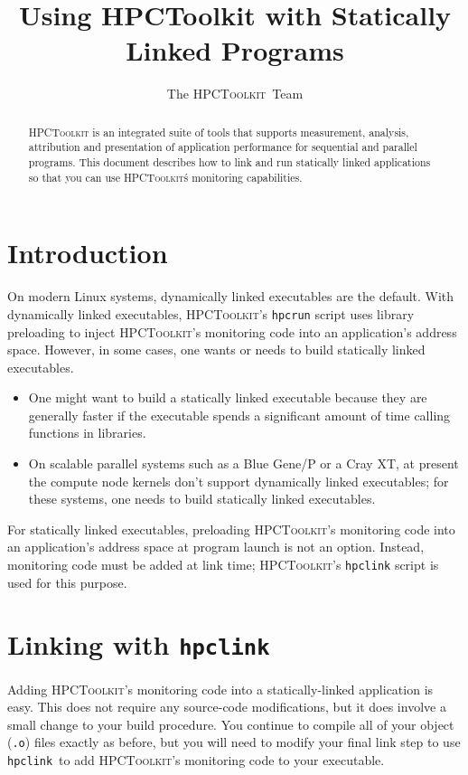 \documentclass[12pt]{article}
\newcommand{\HPCToolkit}{\textsc{HPCToolkit}}
\newcommand{\hpcrun}{\texttt{hpcrun}}
\newcommand{\hpclink}{\texttt{hpclink}}
\begin{document}
\title{Using {\sc HPCToolkit} with Statically Linked Programs}
\author{The \HPCToolkit\ Team}
\maketitle

\begin{abstract}
\HPCToolkit{} is an integrated suite of tools that supports
measurement, analysis, attribution and presentation of application
performance for sequential and parallel programs.  This document
describes how to link and run statically linked applications so that you can use
 \HPCToolkit\'s monitoring capabilities. 
 \end{abstract}

\section{Introduction}
On modern Linux systems, dynamically linked executables are the default. With dynamically linked executables, \HPCToolkit's \hpcrun{} script uses  library preloading
 to inject \HPCToolkit's monitoring code into an application's address space. 
However, in some cases, one wants or needs to build statically linked executables. 
\begin{itemize}
\item One might want to build a statically linked executable because they are generally faster if the executable spends a significant amount of time calling functions in libraries. 
\item On scalable parallel systems such as a Blue Gene/P or a Cray XT, at present the compute node kernels don't support dynamically linked executables; for these systems, one needs to build statically linked executables.
\end{itemize}

For statically linked executables, preloading \HPCToolkit's monitoring code into an application's address space at program launch is not an option. Instead, monitoring code must be added at link time; \HPCToolkit{}'s \hpclink{} script is used for this purpose.

\section{Linking with \hpclink }

Adding \HPCToolkit's monitoring
code into a statically-linked application is easy.  This does not require any
source-code modifications, but it does involve a small change to your
build procedure.  You continue to compile
all of your object ({\tt .o}) files exactly as before, but you will need to 
modify your final link step
to use \hpclink\ to add  \HPCToolkit's monitoring code to your executable.
\end{document}
